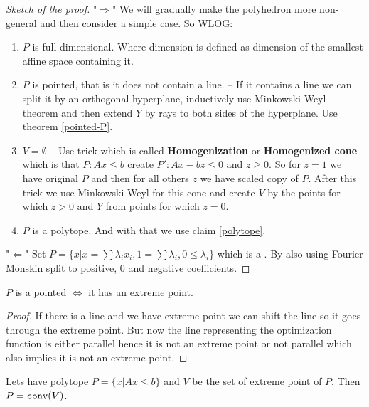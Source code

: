 \begin{proof}[Sketch of the proof]
	"$\Rightarrow$" We will gradually make the polyhedron more non-general and then consider a simple case. So WLOG:

	\begin{enumerate}
		\item $P$ is full-dimensional. Where dimension is defined as dimension of the smallest affine space containing it.
		\item $P$ is pointed, that is it does not contain a line. -- If it contains a line we can split it by an orthogonal hyperplane, inductively use Minkowski-Weyl theorem and then extend $Y$ by rays to both sides of the hyperplane. Use theorem \ref{pointed-P}.
		\item $V = \emptyset$ -- Use trick which is called \textbf{Homogenization} or \textbf{Homogenized cone} which is that $P : Ax \leq b$ create $P' : Ax - bz \leq 0$ and $z \geq 0$. So for $z = 1$ we have original $P$ and then for all others $z$ we have scaled copy of $P$. After this trick we use Minkowski-Weyl for this cone and create $V$ by the points for which $z > 0$ and $Y$ from points for which $z = 0$.
		\item $P$ is a polytope. And with that we use claim \ref{polytope}.
	\end{enumerate}

	"$\Leftarrow$" Set $P = \{x | x = \sum \lambda_{i} x_{i}, 1 = \sum \lambda_{i}, 0 \leq \lambda_{i}\}$ which is a . By also using Fourier Monskin split to positive, 0 and negative coefficients.
\end{proof}

\begin{thm}
	$P$ is a pointed $\iff$ it has an extreme point.
	\label{pointed-P}
\end{thm}

\begin{proof}
	If there is a line and we have extreme point we can shift the line so it goes through the extreme point. But now the line representing the optimization function is either parallel hence it is not an extreme point or not parallel which also implies it is not an extreme point.
\end{proof}

\begin{claim}
Lets have polytope $P = \{x | A x \leq b\}$ and $V$ be the set of extreme point of $P$. Then $P = \mathtt{conv}(V)$.
	\label{polytope}
\end{claim}


